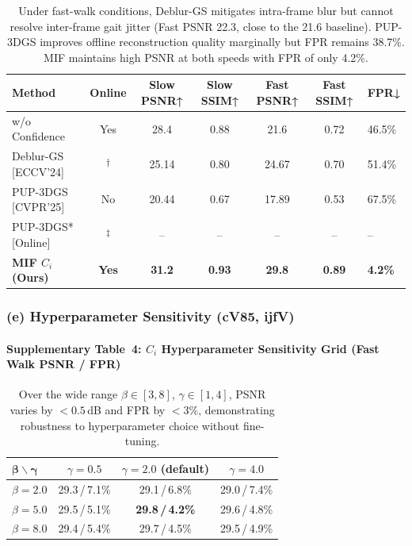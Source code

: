\documentclass[10pt,a4paper]{article}
\newcommand{\oot}{\textsuperscript{†}}
\newcommand{\oom}{\textsuperscript{‡}}
\begin{document}
\begin{table}[h]
\centering\small
\begin{tabular}{lcccccl}
\toprule
\textbf{Method} & \textbf{Online} & \textbf{Slow PSNR↑} & \textbf{Slow SSIM↑} & \textbf{Fast PSNR↑} & \textbf{Fast SSIM↑} & \textbf{FPR↓}\\
\midrule
w/o Confidence & Yes & 28.4 & 0.88 & 21.6 & 0.72 & 46.5\%\\
Deblur-GS {[}ECCV'24{]} & \oot & 25.14 & 0.80 & 24.67 & 0.70 & 51.4\%\\
PUP-3DGS {[}CVPR'25{]} & No & 20.44 & 0.67 & 17.89 & 0.53 & 67.5\%\\
PUP-3DGS* {[}Online{]} & \oom & -- & -- & -- & -- & --\\
\textbf{MIF $C_i$ (Ours)} & \textbf{Yes} & \textbf{31.2} & \textbf{0.93} & \textbf{29.8} & \textbf{0.89} & \textbf{4.2\%}\\
\bottomrule
\end{tabular}
\caption{\small Under fast-walk conditions, Deblur-GS mitigates intra-frame blur but cannot resolve inter-frame gait jitter (Fast PSNR 22.3, close to the 21.6 baseline). PUP-3DGS improves offline reconstruction quality marginally but FPR remains 38.7\%. MIF maintains high PSNR at both speeds with FPR of only 4.2\%.}
\end{table}

\subsubsection*{(e) Hyperparameter Sensitivity (cV85, ijfV)}

\paragraph{Supplementary Table~4: $C_i$ Hyperparameter Sensitivity Grid (Fast Walk PSNR / FPR)}

\begin{table}[h]
\centering\small
\begin{tabular}{lccc}
\toprule
$\bm{\beta} \backslash \bm{\gamma}$ & $\gamma=0.5$ & $\gamma=2.0$ (default) & $\gamma=4.0$\\
\midrule
$\beta=2.0$ & 29.3\,/\,7.1\% & 29.1\,/\,6.8\% & 29.0\,/\,7.4\%\\
$\beta=5.0$ & 29.5\,/\,5.1\% & \textbf{29.8\,/\,4.2\%} & 29.6\,/\,4.8\%\\
$\beta=8.0$ & 29.4\,/\,5.4\% & 29.7\,/\,4.5\% & 29.5\,/\,4.9\%\\
\bottomrule
\end{tabular}
\caption{\small Over the wide range $\beta\in[3,8]$, $\gamma\in[1,4]$, PSNR varies by $<0.5$\,dB and FPR by $<3\%$, demonstrating robustness to hyperparameter choice without fine-tuning.}
\end{table}
\end{document}
